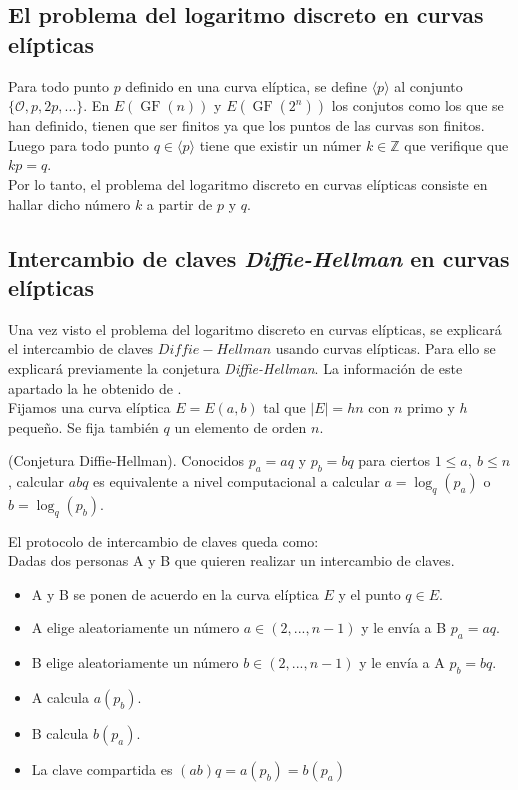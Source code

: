 \begin{aligned*}
\subsection{El problema del logaritmo discreto en curvas elípticas}
Para todo punto $p$ definido en una curva elíptica, se define $\langle p\rangle$ al conjunto $\{\mathcal{O}, p, 2p, ... \}$.
En $E(\operatorname{GF}(n))$ y $E(\operatorname{GF}(2^n))$ los conjutos como los que se han definido, tienen que ser finitos ya que los puntos de las curvas son finitos. Luego para todo punto $q\in \langle p\rangle$ tiene que existir un númer $k \in \mathbb{Z}$ que verifique que $kp=q$.\\
Por lo tanto, el problema del logaritmo discreto en curvas elípticas consiste en hallar dicho número $k$ a partir de $p$ y $q$.
\subsection{Intercambio de claves \emph{Diffie-Hellman} en curvas elípticas}
Una vez visto el problema del logaritmo discreto en curvas elípticas, se explicará el intercambio de claves $Diffie-Hellman$ usando curvas elípticas. Para ello se explicará previamente la conjetura \emph{Diffie-Hellman}. La información de este apartado la he obtenido de \cite{apuntesCriptografia}.\\
Fijamos una curva elíptica $E=E(a,b)$ tal que $|E|=hn$ con $n$ primo y $h$ pequeño. Se fija también $q$ un elemento de orden $n$.
\begin{definicion}
	(Conjetura Diffie-Hellman). Conocidos $p_a=aq$ y $p_b=bq$ para ciertos $1\leq a,\: b\leq n$, calcular $abq$ es equivalente a nivel computacional a calcular $a=\log_q(p_a)$ o $b=\log_q(p_b)$.
\end{definicion}
El protocolo de intercambio de claves queda como:\\

Dadas dos personas A y B que quieren realizar un intercambio de claves.
\begin{itemize}
	\item A y B se ponen de acuerdo en la curva elíptica $E$ y el punto $q\in E$.
	\item A elige aleatoriamente un número $a\in(2,...,n-1)$ y le envía a B $p_a=aq$.
	\item B elige aleatoriamente un número $b\in(2,...,n-1)$ y le envía a A $p_b=bq$.
	\item A calcula $a(p_b)$.
	\item B calcula $b(p_a)$.
	\item La clave compartida es $(ab)q=a(p_b)=b(p_a)$
\end{itemize}


\end{aligned*}
